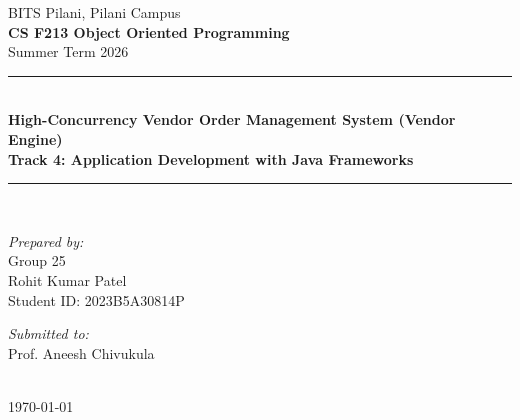 
\begin{titlepage}
    \centering
    \vspace*{2cm}
    
    {\large BITS Pilani, Pilani Campus}\\[1.5cm]
    
    {\large\bfseries CS F213 Object Oriented Programming}\\[0.5cm]
    {\large Summer Term 2026}\\[1.5cm]
    
    \rule{\linewidth}{1.5pt}\\[0.5cm]
    {\huge\bfseries High-Concurrency Vendor Order Management System (Vendor Engine)}\\[0.3cm]
    {\large\bfseries Track 4: Application Development with Java Frameworks}\\[0.5cm]
    \rule{\linewidth}{1.5pt}\\[2cm]
    
    \begin{minipage}[t]{0.45\textwidth}
        \begin{flushleft} \large
            \emph{Prepared by:}\\
            Group 25\\
            Rohit Kumar Patel\\
            Student ID: 2023B5A30814P
        \end{flushleft}
    \end{minipage}
    \hfill
    \begin{minipage}[t]{0.45\textwidth}
        \begin{flushright} \large
            \emph{Submitted to:}\\
            Prof. Aneesh Chivukula
        \end{flushright}
    \end{minipage}\\[3cm]
    
    {\large \today}\\[1cm]
    
    \vfill
\end{titlepage}
